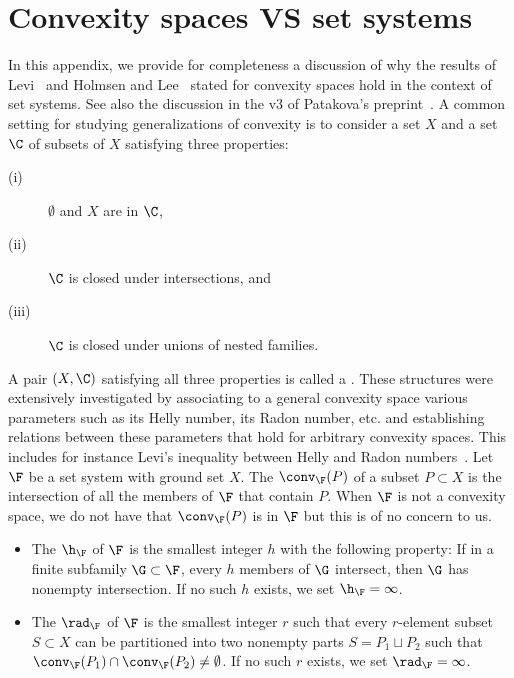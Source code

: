 \section{Convexity spaces VS set systems}\label{app:convspaces}
%
In this appendix, we provide for completeness a discussion of why the results of Levi~\cite{Levi_radon_implies_helly} and Holmsen and Lee~\cite{Holmsen2021} stated for convexity spaces hold in the context of set systems. See also the discussion in the v3 of Patakova's preprint~\cite[Appendix~A]{Pat_kov__2024}.
%
\bigskip
%
A common setting for studying generalizations of convexity is to consider a set $X$ and a set $\C$ of subsets of $X$ satisfying three properties:
%
\begin{description}
\item[(i)] $\emptyset$ and $X$ are in $\C$,
\item[(ii)] $\C$ is closed under intersections, and
\item[(iii)] $\C$ is closed under unions of nested families.
\end{description}
%
\noindent
A pair $(X,\C)$ satisfying all three properties is called a . These structures were extensively investigated by associating to a general convexity space various parameters such as its Helly number, its Radon number, etc. and establishing relations between these parameters that hold for arbitrary convexity spaces. This includes for instance Levi's inequality between Helly and Radon numbers~\cite{Levi_radon_implies_helly}.
%
\medskip
%
Let $\F$ be a set system with ground set $X$. The  $\conv_{\F}(P)$ of a subset $P\subset X$ is the intersection of all the members of $\F$ that contain $P$. When $\F$ is not a convexity space, we do not have that $\conv_{\F}(P)$ is in $\F$ but this is of no concern to us.
%
\begin{itemize}
\item The  $\h_\F$ of $\F$ is the smallest integer $h$ with the following property: If in a finite subfamily $\G \subset\F$, every $h$ members of $\G$ intersect, then $\G$ has nonempty intersection. If no such $h$ exists, we set $\h_\F=\infty$.\medskip
%
\item The  $\rad_\F$ of $\F$ is the smallest integer $r$ such that every $r$-element subset $S\subset X$ can be partitioned into two nonempty parts $S=P_1\sqcup P_2$ such that $\conv_{\F}(P_1) \cap \conv_{\F}(P_2) \neq \emptyset$. If no such $r$ exists, we set $\rad_\F=\infty$.
\end{itemize}
